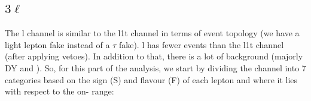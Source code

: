 \documentclass[letterpaper,12pt]{article}
\begin{document}
\begin{table}[h]
  \centering
  \large
  \setlength{\tabcolsep}{20pt}
  \renewcommand{\arraystretch}{2}
  \caption{Summary table for the \2l1t{} channel.}
  \label{tab:2l1t}
\end{table}

\subsection{\Large{\boldmath$3\ell$}}
\label{sec:3l}

The \3l channel is similar to the \2l1t{} channel in terms of event topology (we have a light lepton fake instead of a $\tau$ fake). \3l{} has fewer events than the \2l1t channel (after applying vetoes). In addition to that, there is a lot of background (majorly DY and \WZ). So, for this part of the analysis, we start by dividing the channel into 7 categories based on the sign (S) and flavour (F) of each lepton and where it lies with respect to the on-\Zboson{} range:
\end{document}
